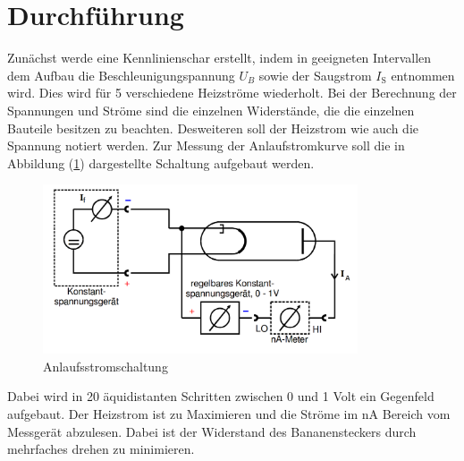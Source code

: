 \section{Durchführung}
\label{sec:Durchführung}
Zunächst werde eine Kennlinienschar erstellt, indem in geeigneten Intervallen dem Aufbau die Beschleunigungspannung $U_B$ sowie der Saugstrom $I_\text{S}$ entnommen wird. Dies wird für 5 verschiedene Heizströme wiederholt. Bei der Berechnung der Spannungen und Ströme sind die einzelnen Widerstände, die die einzelnen Bauteile besitzen zu beachten. Desweiteren soll der Heizstrom wie auch die Spannung notiert werden.
Zur Messung der Anlaufstromkurve soll die in Abbildung (\ref{fig:Anl}) dargestellte Schaltung aufgebaut werden.
\begin{figure}[H]
  \centering
  \includegraphics[height=5cm]{picture/Gegenfeld.png}
  \caption{Anlaufsstromschaltung \cite{pra}}
  \label{fig:Anl}
\end{figure}
Dabei wird in 20 äquidistanten Schritten zwischen 0 und 1 Volt ein Gegenfeld aufgebaut. Der Heizstrom ist zu Maximieren und die Ströme im nA Bereich vom Messgerät abzulesen. Dabei ist der Widerstand des Bananensteckers durch mehrfaches drehen zu minimieren.
